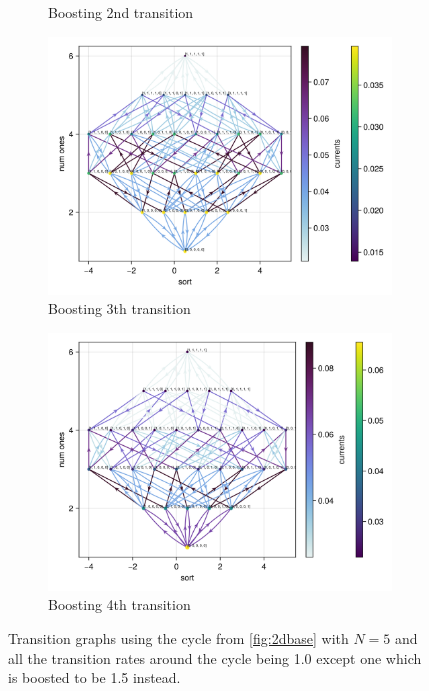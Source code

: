 \documentclass[11pt]{article}
\theoremstyle{nothm}
\begin{document}
\begin{tcolorbox}
\begin{figure}[H]
\begin{subfigure}[t]{0.49\textwidth}
            \caption{Boosting 2nd transition}
        \end{subfigure}
        \begin{subfigure}[t]{0.49\textwidth}
            \centering
            \includegraphics[width=\textwidth]{../../plots/ones/c1weights/N=5w=3.png}
            \caption{Boosting 3th transition}
        \end{subfigure}
        \begin{subfigure}[t]{0.49\textwidth}
            \centering
            \includegraphics[width=\textwidth]{../../plots/ones/c1weights/N=5w=4.png}
            \caption{Boosting 4th transition}
        \end{subfigure}
        \caption{
            Transition graphs using the cycle from \cref{fig:2dbase} with $N=5$ and all the transition rates around the cycle being 1.0 except one which is boosted to be 1.5 instead.
        }\label{fig:2dbase_weights}
    \end{figure}
\end{tcolorbox}
\end{document}
